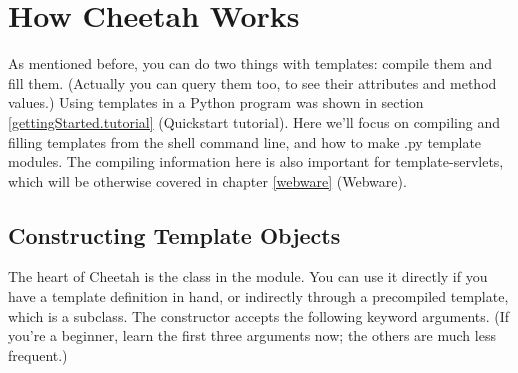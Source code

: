 \section{How Cheetah Works}
\label{howWorks}

As mentioned before, you can do two things with templates: compile them and
fill them.  (Actually you can query them too, to see their attributes and
method values.)  Using templates in a Python program was shown in section
\ref{gettingStarted.tutorial} (Quickstart tutorial).  Here we'll focus on
compiling and filling templates from the shell command line, and how to make
.py template modules.  The compiling information here is also important for
template-servlets, which will be otherwise covered in chapter \ref{webware}
(Webware).

\subsection{Constructing Template Objects}
\label{howWorks.templateClass}
\label{howWorks.constructing}

The heart of Cheetah is the  class in the
 module.  You can use it directly if you have a
template definition in hand, or indirectly through a precompiled template,
which is a subclass.  The constructor accepts the following keyword
arguments.  (If you're a beginner, learn the first three arguments now;
the others are much less frequent.)

